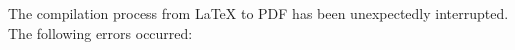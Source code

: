The compilation process from \LaTeX{} to PDF has been unexpectedly interrupted.
The following errors occurred:

